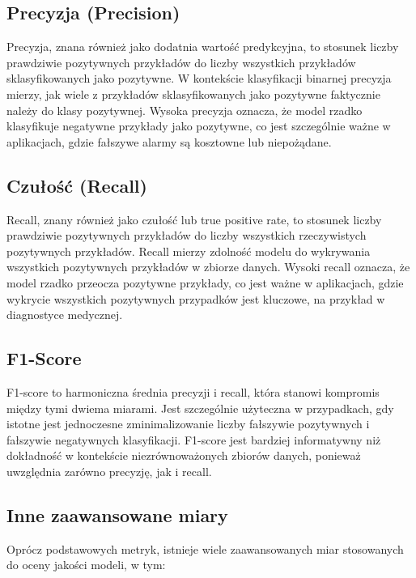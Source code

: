 \subsection*{Precyzja (Precision)}

Precyzja, znana również jako dodatnia wartość predykcyjna, to stosunek liczby prawdziwie pozytywnych 
przykładów do liczby wszystkich przykładów sklasyfikowanych jako pozytywne. W kontekście klasyfikacji 
binarnej precyzja mierzy, jak wiele z przykładów sklasyfikowanych jako pozytywne faktycznie należy do 
klasy pozytywnej. Wysoka precyzja oznacza, że model rzadko klasyfikuje negatywne przykłady jako 
pozytywne, co jest szczególnie ważne w aplikacjach, gdzie fałszywe alarmy są kosztowne lub niepożądane.

\subsection*{Czułość (Recall)}

Recall, znany również jako czułość lub true positive rate, to stosunek liczby prawdziwie pozytywnych 
przykładów do liczby wszystkich rzeczywistych pozytywnych przykładów. Recall mierzy zdolność modelu 
do wykrywania wszystkich pozytywnych przykładów w zbiorze danych. Wysoki recall oznacza, że model 
rzadko przeocza pozytywne przykłady, co jest ważne w aplikacjach, gdzie wykrycie wszystkich 
pozytywnych przypadków jest kluczowe, na przykład w diagnostyce medycznej.

\subsection*{F1-Score}

F1-score to harmoniczna średnia precyzji i recall, która stanowi kompromis między tymi dwiema miarami. 
Jest szczególnie użyteczna w przypadkach, gdy istotne jest jednoczesne zminimalizowanie liczby 
fałszywie pozytywnych i fałszywie negatywnych klasyfikacji. F1-score jest bardziej informatywny niż 
dokładność w kontekście niezrównoważonych zbiorów danych, ponieważ uwzględnia zarówno precyzję, 
jak i recall.

\subsection*{Inne zaawansowane miary}

Oprócz podstawowych metryk, istnieje wiele zaawansowanych miar stosowanych do oceny jakości modeli, 
w tym:

